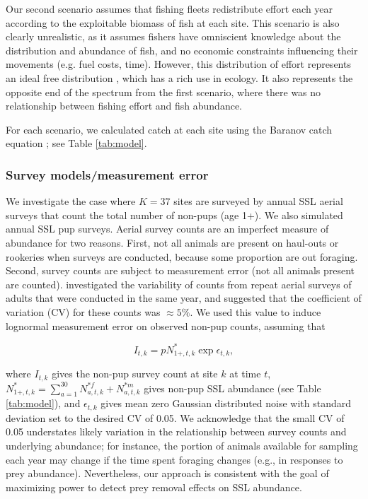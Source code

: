\documentclass[nonumbib,leqno]{nrc1}
\begin{document}
Our second scenario assumes that fishing fleets redistribute effort each year according to the exploitable biomass of fish at each site.  This scenario is also clearly unrealistic, as it assumes fishers have omniscient knowledge about the distribution and abundance of fish, and no economic constraints influencing their movements (e.g. fuel costs, time).  However, this distribution of effort represents an ideal free distribution \citep{FretwellLucas1970}, which has a rich use in ecology.  It also represents the opposite end of the spectrum from the first scenario, where there was no relationship between fishing effort and fish abundance.

For each scenario, we calculated catch at each site using the Baranov catch equation \citep{Baranov1918}; see Table \ref{tab:model}.


\subsubsection{Survey models/measurement error}

We investigate the case where $K=37$ sites are surveyed by annual SSL aerial surveys that count the total
number of non-pups (age 1+).  We also simulated annual SSL pup surveys. Aerial survey counts are an imperfect measure of abundance for two reasons.  First, not all animals are present on haul-outs or rookeries when surveys are conducted, because some proportion are out foraging.  Second, survey counts are subject to measurement error (not all animals present are counted).  \citet{HolmesEtAl2007} investigated the variability of counts from repeat aerial surveys of adults that were conducted in the same year, and suggested that the coefficient of variation (CV) for these counts was $\approx 5\%$.  We used this value to induce lognormal measurement error on observed non-pup counts, assuming that
\begin{linenomath}
  \begin{equation}
     I_{t,k} = p N_{1+,t,k}^{*}\exp{\epsilon_{t,k}},
  \end{equation}
\end{linenomath}
where $I_{t,k}$ gives the non-pup survey count at site $k$ at time $t$, $N_{1+,t,k}^*=\sum_{a=1}^{30} N_{a,t,k}^{*f}+N_{a,t,k}^{*m}$ gives non-pup SSL abundance (see Table \ref{tab:model}), and $\epsilon_{t,k}$ gives mean zero Gaussian distributed noise with standard deviation set to the desired CV of 0.05. We acknowledge that the small CV of 0.05 understates likely variation in the relationship between survey counts and underlying abundance; for instance, the portion of animals available for sampling each year may change if the time spent foraging changes (e.g., in responses to prey abundance).  Nevertheless, our approach is consistent with the goal of maximizing power to detect prey removal effects on SSL abundance.
\end{document}
